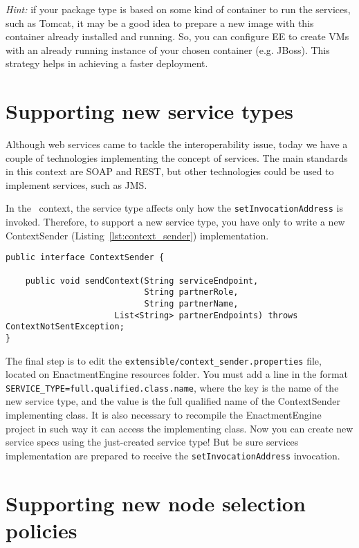 \emph{Hint:} if your package type is based on some kind of container to run the services,
such as Tomcat, it may be a good idea to prepare a new image with this container already
installed and running. So, you can configure EE to create VMs with an already running
instance of your chosen container (e.g. JBoss).
This strategy helps in achieving a faster deployment.


\section{Supporting new service types}

Although web services came to tackle the interoperability issue, today we have a couple of technologies implementing the concept of services.
The main standards in this context are SOAP and REST, but other technologies could be used to implement services, such as JMS.

In the \ee\ context, the service type affects only how the \texttt{setInvocationAddress} is invoked.
Therefore, to support a new service type, you have only to write a new \textsf{ContextSender} (Listing~\ref{lst:context_sender}) implementation.

{\footnotesize
\begin{lstlisting}[caption=\textsf{ContextSender} interface., label=lst:context_sender]
public interface ContextSender {

    public void sendContext(String serviceEndpoint, 
                            String partnerRole, 
                            String partnerName,
                      List<String> partnerEndpoints) throws ContextNotSentException;
}
\end{lstlisting}
}

The final step is to edit the \texttt{extensible/context\_sender.properties} file, located on EnactmentEngine resources folder. You must add a line in the format \verb!SERVICE_TYPE=full.qualified.class.name!, where the key is the name of the new service type, and the value is the full qualified name of the \textsf{ContextSender} implementing class. It is also necessary to recompile the EnactmentEngine project in such way it can access the implementing class. Now you can create new service specs using the just-created service type! But be sure services implementation are prepared to receive the \texttt{setInvocationAddress} invocation.

\section{Supporting new node selection policies}

